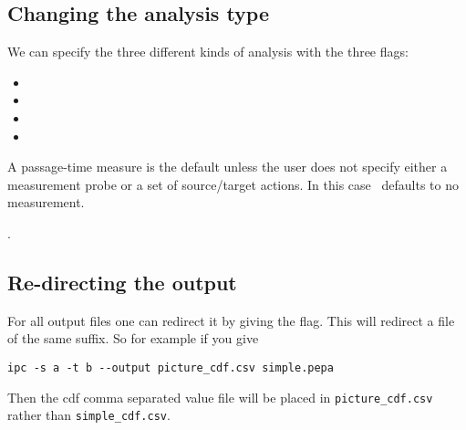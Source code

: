 \subsection{Changing the analysis type}
We can specify the three different kinds of analysis with the
three flags:
\begin{itemize}
\item {}
\item {}
\item {}
\item {}
\end{itemize}

A passage-time measure is the default unless the user does not
specify either a measurement probe or a set of source/target actions.
In this case \ipc\ defaults to no measurement.

.

\subsection{Re-directing the output}
\label{redirectoutputsection}

For all output files one can redirect it by giving the 
flag. This will redirect a file of the same suffix. So for example
if you give

\begin{verbatim}
ipc -s a -t b --output picture_cdf.csv simple.pepa
\end{verbatim}

Then the cdf comma separated value file will be placed in
\texttt{picture\_cdf.csv} rather than \texttt{simple\_cdf.csv}.

